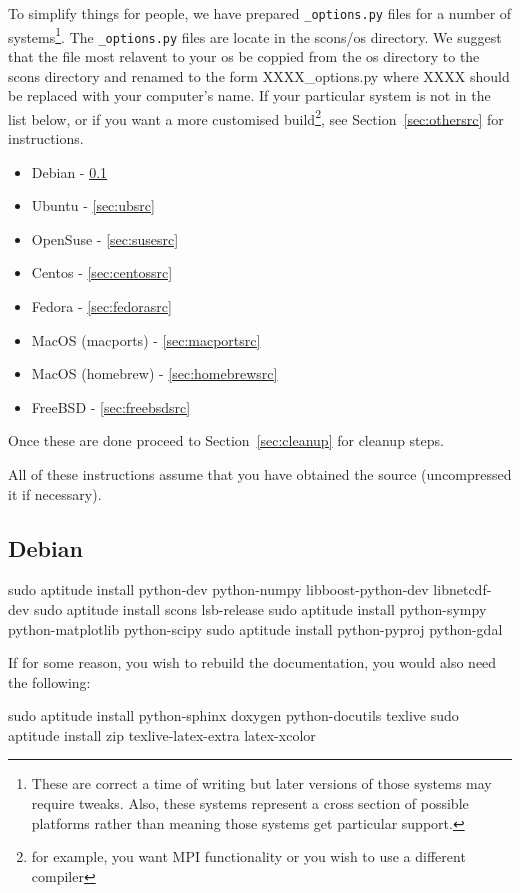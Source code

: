 To simplify things for people, we have prepared \texttt{_options.py} files for a number of 
systems\footnote{These are correct a time of writing but later versions of those systems may require tweaks. 
Also, these systems represent a cross section of possible platforms rather than meaning those systems get particular support.}.
The \texttt{_options.py} files are locate in the scons/os directory. We suggest that the file most relavent to your os 
be coppied from the os directory to the scons directory and renamed to the form XXXX_options.py where XXXX should be replaced with your computer's name.
If your particular system is not in the list below, or if you want a more customised 
build\footnote{for example, you want MPI functionality or you wish to use a different compiler}, 
see Section~\ref{sec:othersrc} for instructions.
\begin{itemize}
 \item Debian - \ref{sec:debsrc}
 \item Ubuntu - \ref{sec:ubsrc}
 \item OpenSuse - \ref{sec:susesrc}
 \item Centos - \ref{sec:centossrc}
 \item Fedora - \ref{sec:fedorasrc}
 \item MacOS (macports) - \ref{sec:macportsrc}
 \item MacOS (homebrew) - \ref{sec:homebrewsrc}
 \item FreeBSD - \ref{sec:freebsdsrc}
\end{itemize}

Once these are done proceed to Section~\ref{sec:cleanup} for cleanup steps.

All of these instructions assume that you have obtained the source (uncompressed it if necessary).
\subsection{Debian}\label{sec:debsrc}

\begin{shellCode}
sudo aptitude install python-dev python-numpy libboost-python-dev libnetcdf-dev
sudo aptitude install scons lsb-release
sudo aptitude install python-sympy python-matplotlib python-scipy
sudo aptitude install python-pyproj python-gdal 
\end{shellCode}


\begin{optionalstep}
If for some reason, you wish to rebuild the documentation, you would also need the following:
\begin{shellCode}
sudo aptitude install python-sphinx doxygen python-docutils texlive 
sudo aptitude install zip texlive-latex-extra latex-xcolor 
\end{shellCode}
\end{optionalstep}

